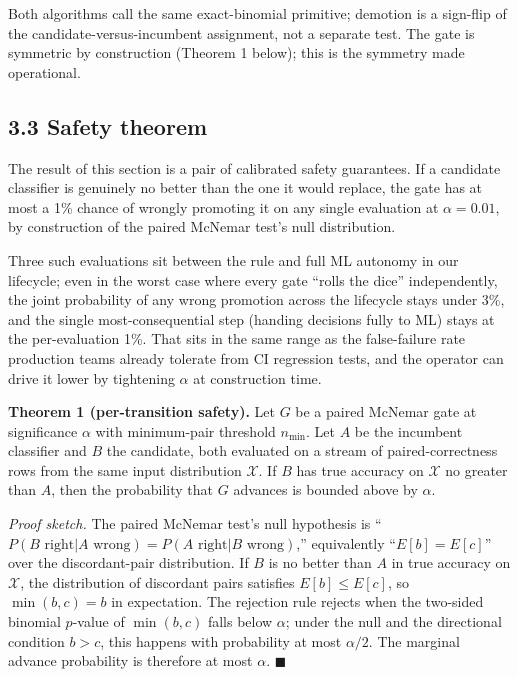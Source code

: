 Both algorithms call the same exact-binomial primitive; demotion is a
sign-flip of the candidate-versus-incumbent assignment, not a separate
test. The gate is symmetric by construction (Theorem 1 below); this is
the symmetry made operational.

\subsection{3.3 Safety theorem}\label{safety-theorem}

The result of this section is a pair of calibrated safety guarantees. If
a candidate classifier is genuinely no better than the one it would
replace, the gate has at most a 1\% chance of wrongly promoting it on
any single evaluation at \(\alpha = 0.01\), by construction of the
paired McNemar test's null distribution.

Three such evaluations sit between the rule and full ML autonomy in our
lifecycle; even in the worst case where every gate ``rolls the dice''
independently, the joint probability of any wrong promotion across the
lifecycle stays under 3\%, and the single most-consequential step
(handing decisions fully to ML) stays at the per-evaluation 1\%. That
sits in the same range as the false-failure rate production teams
already tolerate from CI regression tests, and the operator can drive it
lower by tightening \(\alpha\) at construction time.

\textbf{Theorem 1 (per-transition safety).} Let \(G\) be a paired
McNemar gate at significance \(\alpha\) with minimum-pair threshold
\(n_{\min}\). Let \(A\) be the incumbent classifier and \(B\) the
candidate, both evaluated on a stream of paired-correctness rows from
the same input distribution \(\mathcal{X}\). If \(B\) has true accuracy
on \(\mathcal{X}\) no greater than \(A\), then the probability that
\(G\) advances is bounded above by \(\alpha\).

\emph{Proof sketch.} The paired McNemar test's null hypothesis is
``\(P(B \text{ right} | A \text{ wrong}) = P(A \text{ right} | B \text{ wrong})\),''
equivalently ``\(E[b] = E[c]\)'' over the discordant-pair distribution.
If \(B\) is no better than \(A\) in true accuracy on \(\mathcal{X}\),
the distribution of discordant pairs satisfies \(E[b] \le E[c]\), so
\(\min(b, c) = b\) in expectation. The rejection rule rejects when the
two-sided binomial \(p\)-value of \(\min(b, c)\) falls below \(\alpha\);
under the null and the directional condition \(b > c\), this happens
with probability at most \(\alpha / 2\). The marginal advance
probability is therefore at most \(\alpha\). \(\blacksquare\)

